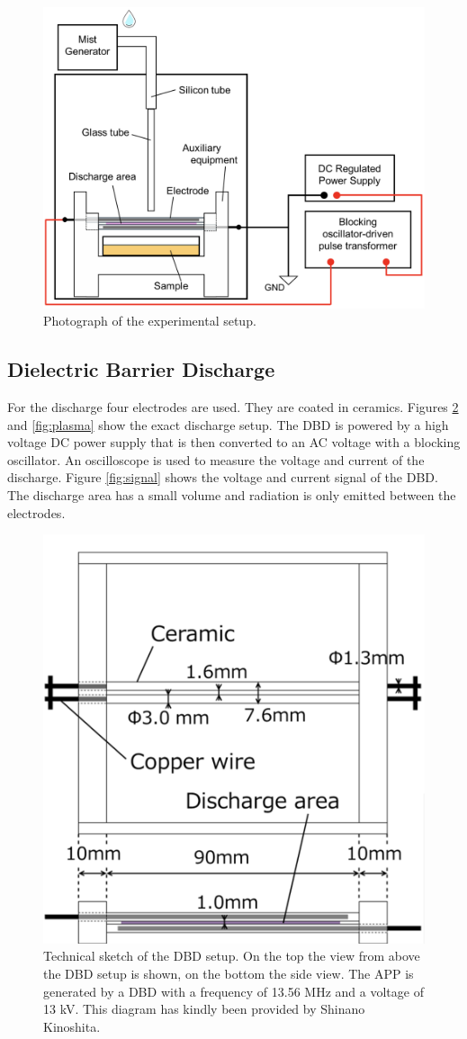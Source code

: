 \begin{figure}
    \centering
    \includegraphics[width=.6\textwidth]{images/Process_setup.png}
    \caption[Photograph of the setup]{Photograph of the experimental setup. }
    \label{fig:photo}
\end{figure}

\subsection{Dielectric Barrier Discharge}
\label{sec:dbd}
For the discharge four electrodes are used. They are coated in ceramics. Figures \ref{fig:dbd} and \ref{fig:plasma} show the exact discharge setup. The DBD is powered by a high voltage DC power supply that is then converted to an AC voltage with a blocking oscillator. An oscilloscope is used to measure the voltage and current of the discharge. Figure \ref{fig:signal} shows the voltage and current signal of the DBD. The discharge area has a small volume and radiation is only emitted between the electrodes. 
\begin{figure}
    \centering
    \includegraphics[width=.65\textwidth]{images/APP_setup.png}
    \caption[Technical sketch of the DBD setup]{Technical sketch of the DBD setup. On the top the view from above the DBD setup is shown, on the bottom the side view. The APP is generated by a DBD with a frequency of 13.56 MHz and a voltage of 13 kV. This diagram has kindly been provided by Shinano Kinoshita.}
    \label{fig:dbd}
\end{figure}

